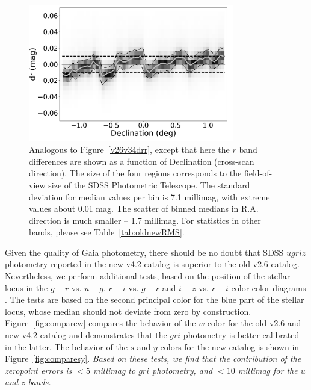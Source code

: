 \documentclass[fleqn,usenatbib]{mnras}
\begin{document}
\begin{figure}[th!]
    \centering\includegraphics[width=9cm]{figures/testV26vsV42_r_dr_Dec_Hess.png} 
\caption{Analogous to Figure~\ref{v26v34drr}, except that here the $r$ band
differences are shown as a function of Declination (cross-scan direction). The size 
of the four regions corresponds to the field-of-view size of the SDSS Photometric Telescope. 
The standard deviation for median values per bin is 7.1 millimag, with extreme values about 
0.01 mag. The scatter of binned medians in R.A. direction is much smaller -- 1.7 millimag. 
For statistics in other bands, please see Table~\ref{tab:oldnewRMS}.}
\label{fig:v26v34drDec}
\end{figure}
 


Given the quality of Gaia photometry, there should be no doubt that SDSS $ugriz$ photometry
reported in the new v4.2 catalog is superior to the old v2.6 catalog. Nevertheless, we perform
additional tests, based on the position of the stellar locus in the $g-r$ vs. $u-g$, $r-i$ vs. $g-r$ 
and $i-z$ vs. $r-i$ color-color diagrams  \citep{2004AN....325..583I}. The tests are based
on the second principal color for the blue part of the stellar locus, whose median should 
not deviate from zero by construction. Figure~\ref{fig:comparew} compares the behavior
of the $w$ color for the old v2.6 and new v4.2 catalog and demonstrates that the $gri$
photometry is better calibrated in the latter. The behavior of the $s$ and $y$ colors for the 
new catalog is shown in Figure~\ref{fig:comparesy}. {\it Based on these tests, we find that 
the contribution of the zeropoint errors is $<5$ millimag to $gri$ photometry, and 
$<10$ millimag for the $u$ and $z$ bands.} 
\end{document}
